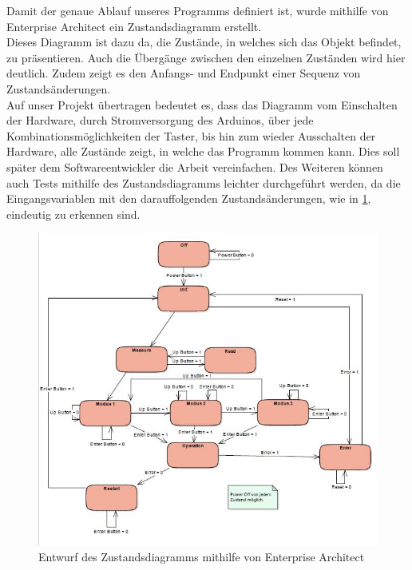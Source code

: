 \label{ArchitekturundVerhalten}


Damit der genaue Ablauf unseres Programms definiert ist, wurde mithilfe von Enterprise Architect ein Zustandsdiagramm erstellt. \\
Dieses Diagramm ist dazu da, die Zustände, in welches sich das Objekt befindet, zu präsentieren. Auch die Übergänge zwischen den einzelnen Zuständen wird hier deutlich. Zudem zeigt es den Anfangs- und Endpunkt einer Sequenz von Zustandsänderungen. \cite[vgl. S. 120]{JosephSchmuller.2000} \\
Auf unser Projekt übertragen bedeutet es, dass das Diagramm vom Einschalten der Hardware, durch Stromversorgung des Arduinos, über jede Kombinationsmöglichkeiten der Taster, bis hin zum wieder Ausschalten der Hardware, alle Zustände zeigt, in welche das Programm kommen kann. Dies soll später dem Softwareentwickler die Arbeit vereinfachen. Des Weiteren können auch Tests mithilfe des Zustandsdiagramms leichter durchgeführt werden, da die Eingangsvariablen mit den darauffolgenden Zustandsänderungen, wie in \ref{fig:Statemachine}, eindeutig zu erkennen sind. \\

\begin{figure}[!hbt]
	\centering
	\includegraphics[width=0.9\linewidth]{Images/Statemachine}
	\caption{Entwurf des Zustandsdiagramms mithilfe von Enterprise Architect}
	\label{fig:Statemachine}
\end{figure}

